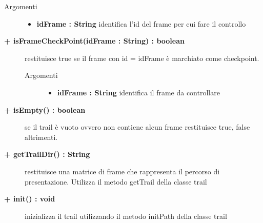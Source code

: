 \begin{description}
\begin{description}
		\begin{description}
			\item[Argomenti] \hfill
				\begin{itemize}
				
					\item \textbf{idFrame : String			} \hfill
						identifica l'id del frame per cui fare il controllo
					
				\end{itemize}
		\end{description}
	\end{description}
	
	\begin{description}
		\item[\textbf{\color{blue}+ isFrameCheckPoint(idFrame : String) : boolean			}] \hfill
			restituisce true se il frame con id = idFrame è marchiato come checkpoint.
			
		\begin{description}
			\item[Argomenti] \hfill
				\begin{itemize}
				
					\item \textbf{idFrame : String			} \hfill
						identifica il frame da controllare
					
				\end{itemize}
		\end{description}
	\end{description}
	
	\begin{description}
		\item[\textbf{\color{blue}+ isEmpty() : boolean			}] \hfill
			se il trail è vuoto ovvero non contiene alcun frame restituisce true, false altrimenti.
			
	\end{description}
	
	\begin{description}
		\item[\textbf{\color{blue}+ getTrailDir() : String			}] \hfill
			restituisce una matrice di frame che rappresenta il percorso di presentazione. Utilizza il metodo getTrail della classe trail

	\end{description}
	
	\begin{description}
		\item[\textbf{\color{blue}+ init() : void			}] \hfill
			inizializza il trail utilizzando il metodo initPath della classe trail
		
	\end{description}
		
\end{description}

